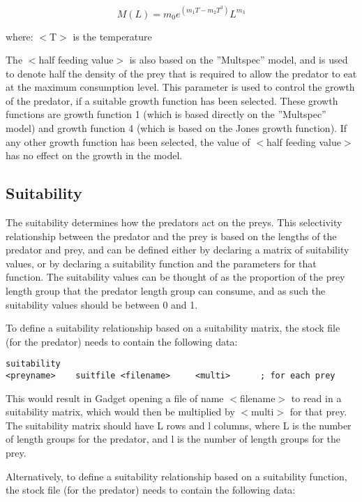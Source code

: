 \documentclass [a4paper, 10pt]{book}
\begin{document}
\begin{equation}\label{eq:maxcons}
M(L) = m_{0} e^{(m_{1}T - m_{2}T^3)} L^{m_{3}}
\end{equation}

where:\newline
$<$T$>$ is the temperature

\bigskip
The $<$half feeding value$>$ is also based on the ''Multspec'' model, and is used to denote half the density of the prey that is required to allow the predator to eat at the maximum consumption level.  This parameter is used to control the growth of the predator, if a suitable growth function has been selected.  These growth functions are growth function 1 (which is based directly on the ''Multspec'' model) and growth function 4 (which is based on the Jones growth function).  If any other growth function has been selected, the value of $<$half feeding value$>$ has no effect on the growth in the model.

\subsection{Suitability}\label{subsec:stocksuitability}
The suitability determines how the predators act on the preys.  This selectivity relationship between the predator and the prey is based on the lengths of the predator and prey, and can be defined either by declaring a matrix of suitability values, or by declaring a suitability function and the parameters for that function.  The suitability values can be thought of as the proportion of the prey length group that the predator length group can consume, and as such the suitability values should be between 0 and 1.

\bigskip
To define a suitability relationship based on a suitability matrix, the stock file (for the predator) needs to contain the following data:

\begin{verbatim}
suitability
<preyname>    suitfile <filename>     <multi>      ; for each prey
\end{verbatim}

This would result in Gadget opening a file of name $<$filename$>$ to read in a suitability matrix, which would then be multiplied by $<$multi$>$ for that prey.  The suitability matrix should have L rows and l columns, where L is the number of length groups for the predator, and l is the number of length groups for the prey.

\bigskip
Alternatively, to define a suitability relationship based on a suitability function, the stock file (for the predator) needs to contain the following data:
\end{document}
